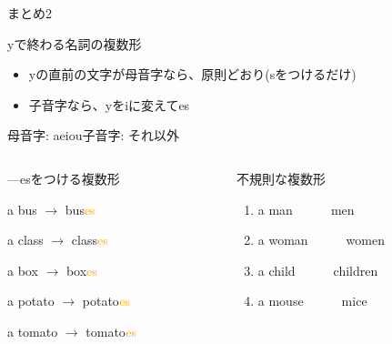 \documentclass[aspectratio=169,xcolor={dvipsnames,table}]{beamer}
\begin{document}
\begin{frame}[plain]{まとめ2}
 \begin{block}{yで終わる名詞の複数形}
\begin{itemize}
 \item yの直前の文字が母音字なら、原則どおり(sをつけるだけ)\hspace{15pt}\dbend
 \item \phantom{yの直前の文字が}子音字なら、yをiに変えてes 
\end{itemize}
\hfill{\scriptsize 母音字: aeiou\hspace{10pt}子音字: それ以外}
\end{block}

\pause

\begin{columns}
\begin{column}{.45\textwidth}
\begin{block}{---esをつける複数形}

a bus $\longrightarrow$ bus\textcolor{orange}{es}%
\hfill{}\hspace*{25pt}

a class $\longrightarrow$ class\textcolor{orange}{es}
\hfill{}\hspace*{25pt}

a box  $\longrightarrow$ box\textcolor{orange}{es}
\hfill{}\hspace*{25pt}

a potato $\longrightarrow$ potato\textcolor{orange}{es}
\hfill{}\hspace*{25pt}

a tomato $\longrightarrow$ tomato\textcolor{orange}{es}
\hfill{}\hspace*{25pt}
\end{block}
\end{column}
\pause
\begin{column}{.45\textwidth}
\begin{block}{不規則な複数形}
 \begin{enumerate}
 \item a man~~~\rightarrow{}~~~men
 \item a woman~~~\rightarrow{}~~~women
 \item a child~~~\rightarrow{}~~~children
 \item a mouse~~~\rightarrow{}~~~mice
  \end{enumerate}
\end{block}
\end{column}
\end{columns}
\end{frame}
\end{document}
